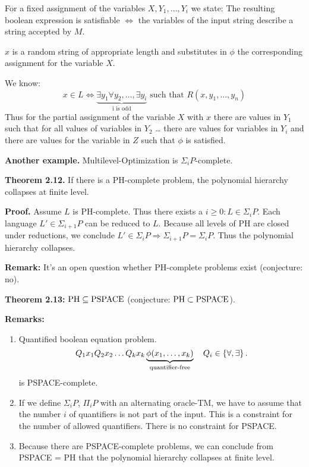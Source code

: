 \documentclass[a4paper]{article}
\newcommand{\cls}[1]{\rm{#1}}
\newcommand{\set}[1]{\left\{#1\right\}}
\begin{document}
For a fixed assignment of the variables $X, Y_1, \ldots, Y_i$ we state:
The resulting boolean expression is satisfiable $\Leftrightarrow$
the variables of the input string describe a string accepted by $M$.

$x$ is a random string of appropriate length and substitutes in $\phi$
the corresponding assignment for the variable $X$.

We know:
\[
  x \in L \Leftrightarrow \underbrace{\exists y_1 \forall y_2, \ldots,
    \exists y_i}_{\text{i is odd}} \text{ such that } R(x, y_1, \ldots, y_n)
\]
Thus for the partial assignment of the variable $X$ with $x$ there are
values in $Y_1$ such that for all values of variables in $Y_2$ \dots
there are values for variables in $Y_i$ and there are values for the
variable in $Z$ such that $\phi$ is satisfied.

\textbf{Another example.}
  Multilevel-Optimization is $\Sigma_i P$-complete.

\textbf{Theorem 2.12.}
  If there is a \cls{PH}-complete problem, the polynomial hierarchy collapses
  at finite level.

\textbf{Proof.}
  Assume $L$ is \cls{PH}-complete. Thus there exists a $i \geq 0: L \in \Sigma_i P$.
  Each language $L' \in \Sigma_{i+1} P$ can be reduced to $L$.
  Because all levels of \cls{PH} are closed under reductions,
  we conclude $L' \in \Sigma_i P \Rightarrow \Sigma_{i+1} P = \Sigma_i P$.
  Thus the polynomial hierarchy collapses.

\textbf{Remark:}
  It's an open question whether \cls{PH}-complete problems exist (conjecture: no).

\textbf{Theorem 2.13:}
  $\cls{PH} \subseteq \cls{PSPACE}$ (conjecture: $\cls{PH} \subset \cls{PSPACE}$).

\textbf{Remarks:}
\begin{enumerate}
  \item Quantified boolean equation problem.
        \[
          Q_1 x_1 Q_2 x_2 \ldots Q_k x_k \underbrace{\phi(x_1,\ldots,x_k)}_%
            {\text{quantifier-free}} \quad Q_i \in \set{\forall, \exists}.
        \]
        is PSPACE-complete.
  \item If we define $\Sigma_i P$, $\Pi_i P$ with an alternating oracle-TM,
        we have to assume that the number $i$ of quantifiers is not part of the
        input. This is a constraint for the number of allowed quantifiers.
        There is no constraint for \cls{PSPACE}.
  \item Because there are \cls{PSPACE}-complete problems, we can conclude from
        \cls{PSPACE} = \cls{PH} that the polynomial hierarchy collapses at
        finite level.
\end{enumerate}
\end{document}
